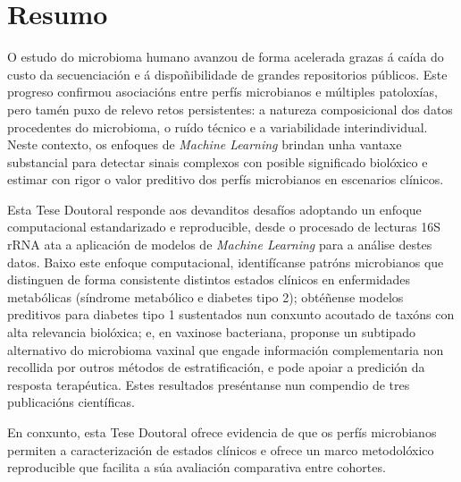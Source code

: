 

\chapter*{Resumo}
\label{sec:abstract_galician}

O estudo do microbioma humano avanzou de forma acelerada grazas á caída do custo da secuenciación e á dispoñibilidade de grandes repositorios públicos. Este progreso confirmou asociacións entre perfís microbianos e múltiples patoloxías, pero tamén puxo de relevo retos persistentes: a natureza composicional dos datos procedentes do microbioma, o ruído técnico e a variabilidade interindividual. Neste contexto, os enfoques de \textit{Machine Learning} brindan unha vantaxe substancial para detectar sinais complexos con posible significado biolóxico e estimar con rigor o valor preditivo dos perfís microbianos en escenarios clínicos.

Esta Tese Doutoral responde aos devanditos desafíos adoptando un enfoque computacional estandarizado e reproducible, desde o procesado de lecturas 16S rRNA ata a aplicación de modelos de \textit{Machine Learning} para a análise destes datos. Baixo este enfoque computacional, identifícanse patróns microbianos que distinguen de forma consistente distintos estados clínicos en enfermidades metabólicas (síndrome metabólico e diabetes tipo 2); obtéñense modelos preditivos para diabetes tipo 1 sustentados nun conxunto acoutado de taxóns con alta relevancia biolóxica; e, en vaxinose bacteriana, proponse un subtipado alternativo do microbioma vaxinal que engade información complementaria non recollida por outros métodos de estratificación, e pode apoiar a predición da resposta terapéutica. Estes resultados preséntanse nun compendio de tres publicacións científicas.

En conxunto, esta Tese Doutoral ofrece evidencia de que os perfís microbianos permiten a caracterización de estados clínicos e ofrece un marco metodolóxico reproducible que facilita a súa avaliación comparativa entre cohortes.